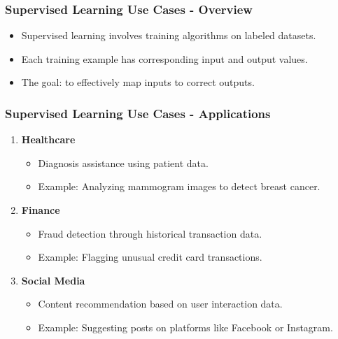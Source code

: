\documentclass[aspectratio=169]{beamer}
\begin{document}
\begin{frame}[fragile]
    \frametitle{Supervised Learning Use Cases - Overview}
    \begin{itemize}
        \item Supervised learning involves training algorithms on labeled datasets.
        \item Each training example has corresponding input and output values.
        \item The goal: to effectively map inputs to correct outputs.
    \end{itemize}
\end{frame}

\begin{frame}[fragile]
    \frametitle{Supervised Learning Use Cases - Applications}
    \begin{enumerate}
        \item \textbf{Healthcare}
            \begin{itemize}
                \item Diagnosis assistance using patient data.
                \item Example: Analyzing mammogram images to detect breast cancer.
            \end{itemize}
        \item \textbf{Finance}
            \begin{itemize}
                \item Fraud detection through historical transaction data.
                \item Example: Flagging unusual credit card transactions.
            \end{itemize}
        \item \textbf{Social Media}
            \begin{itemize}
                \item Content recommendation based on user interaction data.
                \item Example: Suggesting posts on platforms like Facebook or Instagram.
            \end{itemize}
    \end{enumerate}
\end{frame}
\end{document}

